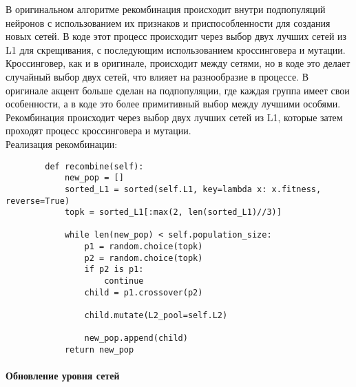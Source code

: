 \documentclass[a4paper,12pt]{article}
\begin{document}
В оригинальном алгоритме рекомбинация происходит внутри подпопуляций нейронов с использованием их признаков и приспособленности для создания новых сетей. В коде этот процесс происходит через выбор двух лучших сетей из L1 для скрещивания, с последующим использованием кроссинговера и мутации. Кроссинговер, как и в оригинале, происходит между сетями, но в коде это делает случайный выбор двух сетей, что влияет на разнообразие в процессе. В оригинале акцент больше сделан на подпопуляции, где каждая группа имеет свои особенности, а в коде это более примитивный выбор между лучшими особями.
Рекомбинация происходит через выбор двух лучших сетей из L1, которые затем проходят процесс кроссинговера и мутации.~\\ 
Реализация рекомбинации:
\begin{itemize}
        
        \begin{lstlisting}
        def recombine(self):
            new_pop = []
            sorted_L1 = sorted(self.L1, key=lambda x: x.fitness, reverse=True)
            topk = sorted_L1[:max(2, len(sorted_L1)//3)]
            
            while len(new_pop) < self.population_size:
                p1 = random.choice(topk)
                p2 = random.choice(topk)
                if p2 is p1:
                    continue
                child = p1.crossover(p2)
                
                child.mutate(L2_pool=self.L2)  
                
                new_pop.append(child)
            return new_pop
        \end{lstlisting}
	\end{itemize}

\paragraph{Обновление уровня сетей}~\\
\end{document}
